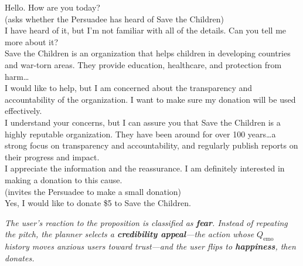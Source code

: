 \begin{dialoguebox}[title=Example 1: fear about transparency, met with a credibility appeal
(success, 5 turns)]
\small
{} Hello. How are you today?\\[2pt]
 (asks whether the Persuadee has heard of Save the Children)\\
 I have heard of it, but I'm not familiar with all of the details. Can you tell me more about it?\\[2pt]
 Save the Children is an organization that helps children in developing countries and war-torn areas. They provide education, healthcare, and protection from harm\ldots\\
 I would like to help, but I am concerned about the transparency and accountability of the organization. I want to make sure my donation will be used effectively.\\[2pt]
\pivot{} I understand your concerns, but I can assure you that Save the Children is a highly reputable organization. They have been around for over 100 years\ldots a strong focus on transparency and accountability, and regularly publish reports on their progress and impact.\\
 I appreciate the information and the reassurance. I am definitely interested in making a donation to this cause.\\[2pt]
 (invites the Persuadee to make a small donation)\\
 Yes, I would like to donate \$5 to Save the Children.
\end{dialoguebox}

\noindent\textit{The user's reaction to the proposition is classified as \textbf{fear}.
Instead of repeating the pitch, the planner selects a \textbf{credibility appeal}---the action
whose $Q_{\text{emo}}$ history moves anxious users toward trust---and the user flips to
\textbf{happiness}, then donates.}

